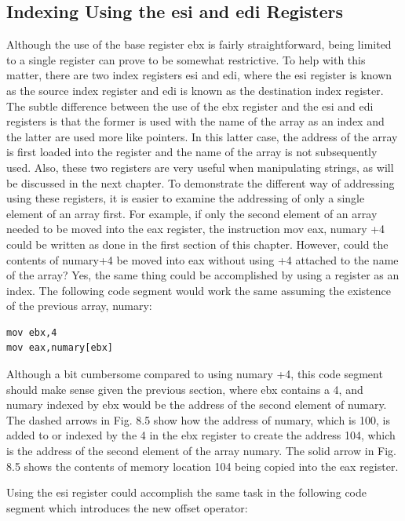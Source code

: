 \documentclass[10pt]{book}
\begin{document}
\subsection{Indexing Using the esi and edi Registers}
Although the use of the base register ebx is fairly straightforward, being limited to a single register can prove to be somewhat restrictive. To help with this matter, there are two index registers esi and edi, where the esi register is known as the source index register and edi is known as the destination index register. The subtle difference between the use of the ebx register and the esi and edi registers is that the former is used with the name of the array as an index and the latter are used more like pointers. In this latter case, the address of the array is first loaded into the register and the name of the array is not subsequently used. Also, these two registers are very useful when manipulating strings, as will be discussed in the next chapter.
To demonstrate the different way of addressing using these registers, it is easier to examine the addressing of only a single element of an array first. For example, if only the second element of an array needed to be moved into the eax register, the instruction mov eax, numary +4 could be written as done in the first section of this chapter. However, could the contents of numary+4 be moved into eax without using +4 attached to the name of the array? Yes, the same thing could be accomplished by using a register as an index. The following code segment would work the same assuming the existence of the previous array, numary:

\begin{verbatim}
mov ebx,4
mov eax,numary[ebx]
\end{verbatim}

Although a bit cumbersome compared to using numary +4, this code segment should make sense given the previous section, where ebx contains a 4, and numary indexed by ebx would be the address of the second element of numary. The dashed arrows in Fig. 8.5 show how the address of numary, which is 100, is added to or indexed by the 4 in the ebx register to create the address 104, which is the address of the second element of the array numary. The solid arrow in Fig. 8.5 shows the contents of memory location 104 being copied into the eax register.

Using the esi register could accomplish the same task in the following code segment which introduces the new offset operator:
\end{document}
